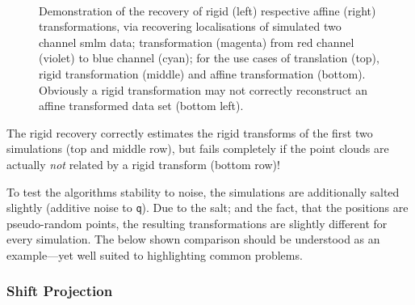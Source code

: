 \documentclass[11pt, a4paper, oneside, twocolumn]{report}
\renewcommand{\tt}{\texttt}
\newcommand{\e}{\emph}
\begin{document}
\begin{figure}[!t]
\begin{subfigure}[t!]{0.44\textwidth}
  \end{subfigure}
  ~
  \begin{subfigure}[t!]{0.44\textwidth}
    \centering
  \end{subfigure}
  \caption{Demonstration of the recovery of rigid (left) respective
    affine (right) transformations, via recovering localisations of
    simulated two channel \gls{smlm} data; transformation (magenta) from red
    channel (violet) to blue channel (cyan); for the use cases of
    translation (top), rigid transformation (middle) and affine
    transformation (bottom). Obviously a rigid transformation may not
    correctly reconstruct an affine transformed data set (bottom
    left).}
  \label{f:transim}
\end{figure}

The rigid recovery correctly estimates the rigid transforms of the
first two simulations (top and middle row), but fails completely if
the point clouds are actually \e{not} related by a rigid transform
(bottom row)!

To test the algorithms stability to noise, the simulations are
additionally salted slightly (additive noise to \tt{q}). Due to the
salt; and the fact, that the positions are pseudo-random points, the
resulting transformations are slightly different for every simulation.
The below shown comparison should be understood as an example---yet
well suited to highlighting common problems.

\subsubsection{Shift Projection}
\end{document}
